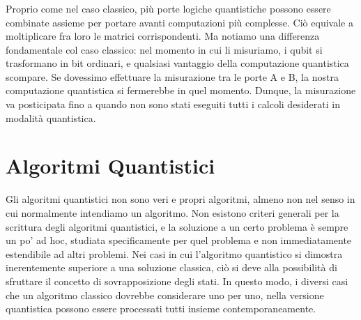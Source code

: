 

\subsubsection{}
Proprio come nel caso classico, più porte logiche quantistiche
possono essere combinate assieme per portare avanti computazioni
più complesse. Ciò equivale a moltiplicare fra loro le matrici
corrispondenti. Ma notiamo una differenza fondamentale col caso classico: nel
momento in cui li misuriamo, i qubit si trasformano in bit ordinari,
e qualsiasi vantaggio della computazione quantistica scompare.
Se dovessimo effettuare la misurazione tra le porte A e B, la nostra
computazione quantistica si fermerebbe in quel momento.
Dunque, la misurazione va posticipata fino a quando non sono stati
eseguiti tutti i calcoli desiderati in modalità quantistica.



\section{Algoritmi Quantistici}

Gli algoritmi quantistici non sono veri e propri algoritmi, almeno non
nel senso in cui normalmente intendiamo un algoritmo. Non esistono criteri generali per la scrittura degli algoritmi quantistici,
e la soluzione a un certo problema è sempre un po’ ad hoc, studiata
specificamente per quel problema e non immediatamente estendibile
ad altri problemi. 
Nei casi in cui l’algoritmo quantistico si dimostra inerentemente
superiore a una soluzione classica, ciò si deve alla possibilità di
sfruttare il concetto di sovrapposizione degli stati. In questo modo,
i diversi casi che un algoritmo classico dovrebbe considerare uno
per uno, nella versione quantistica possono essere processati tutti
insieme contemporaneamente.

